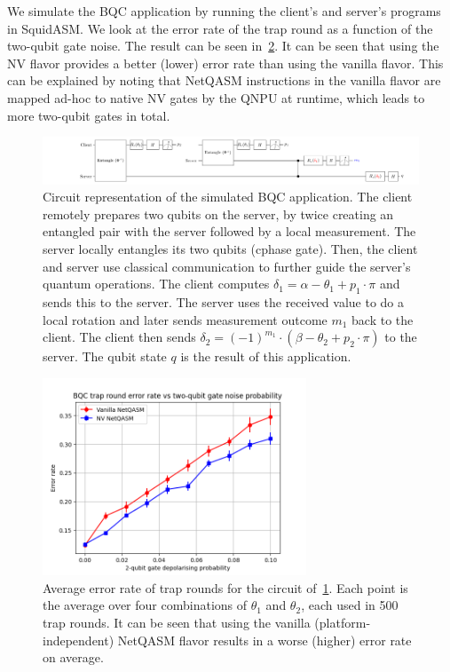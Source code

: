 We simulate the BQC application by running the client's and server's programs in SquidASM.
We look at the error rate of the trap round as a function of the two-qubit gate noise.
The result can be seen in~\cref{netqasm:fig:plot_bqc}.
It can be seen that using the NV flavor provides a better (lower) error rate than using the vanilla flavor.
This can be explained by noting that \ac{NetQASM} instructions in the vanilla flavor are mapped ad-hoc to native NV gates by the \ac{QNPU} at runtime, which leads to more two-qubit gates in total.


\begin{figure}[t]
  \centering
  \includegraphics[width=1.0\textwidth]{figures/netqasm/bqc_app.pdf}
  \caption{Circuit representation of the simulated BQC application. The client
    remotely prepares two qubits on the server, by twice creating an
    entangled pair with the server followed by a local measurement. The
    server locally entangles its two qubits (cphase gate). Then, the client
    and server use classical communication to further guide the server's
    quantum operations. The client computes $\delta_1 = \alpha - \theta_1 +
      p_1 \cdot \pi$ and sends this to the server. The server uses the
    received value to do a local rotation and later sends measurement
    outcome $m_1$ back to the client. The client then sends $\delta_2 =
      (-1)^{m_1} \cdot (\beta - \theta_2 + p_2 \cdot \pi)$ to the server.
    The qubit state $q$ is the result of this application.
  }
  \label{netqasm:fig:bqc_app}
\end{figure}


\begin{figure}[t]
  \centering
  \includegraphics[width=0.7\textwidth]{figures/netqasm/plots/bqc_sweep_gate_noise_trap.png}
  \caption{
    Average error rate of trap rounds for the circuit of~\cref{netqasm:fig:bqc_app}.
    Each point is the average over four combinations of $\theta_1$ and $\theta_2$,
    each used in 500 trap rounds. It can be seen that using the vanilla (platform-independent)
    \ac{NetQASM} flavor results in a worse (higher) error rate on average.}
  \label{netqasm:fig:plot_bqc}
\end{figure}

